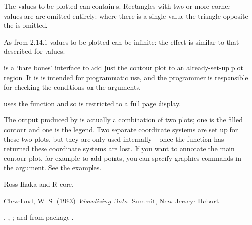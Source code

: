 %
\begin{Details}\relax
The values to be plotted can contain s.  Rectangles with two
or more corner values are  are omitted entirely: where there
is a single  value the triangle opposite the  is
omitted.

As from \R{} 2.14.1 values to be plotted can be infinite: the effect is
similar to that described for  values.

 is a `bare bones' interface to add
just the contour plot to an already-set-up plot region.  It is is
intended for programmatic use, and the programmer is
responsible for checking the conditions on the arguments.
\end{Details}
%
\begin{Note}\relax
{} uses the  function and so is
restricted to a full page display.

The output produced by  is actually a combination
of two plots; one is the filled contour and one is the legend.  Two
separate coordinate systems are set up for these two plots, but they
are only used internally -- once the function has returned these
coordinate systems are lost.  If you want to annotate the main contour
plot, for example to add points, you can specify graphics commands in
the  argument.  See the examples.
\end{Note}
%
\begin{Author}\relax
Ross Ihaka and R-core.
\end{Author}
%
\begin{References}\relax
Cleveland, W. S. (1993)
\emph{Visualizing Data}.
Summit, New Jersey: Hobart.
\end{References}
%
\begin{SeeAlso}\relax
{}, ,
; 
and  from package .
\end{SeeAlso}
%
